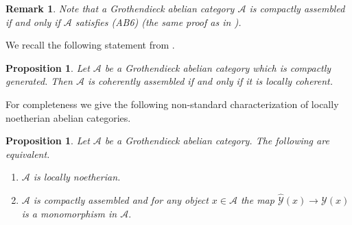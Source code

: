 \documentclass[11pt,leqno]{amsart}
\newtheorem{prop}[theo]{Proposition}
\newtheorem{remark}[theo]{Remark}
\numberwithin{equation}{section}
\newcommand{\cA}{{\mathcal A}}
\newcommand{\cY}{{\mathcal Y}}
\begin{document}
\begin{remark}
Note that a Grothendieck abelian category $\cA$ is compactly assembled if and only if $\cA$ satisfies (AB6) (the same proof as in \cite[Proposition 1.53]{E24}).
\end{remark}

We recall the following statement from \cite{E24}.

\begin{prop}\label{prop:coh_ass_comp_gen}\cite[Proposition E.8]{E24}
	Let $\cA$ be a Grothendieck abelian category which is compactly generated. Then $\cA$ is coherently assembled if and only if it is locally coherent.
\end{prop}

For completeness we give the following non-standard characterization of locally noetherian abelian categories.

\begin{prop}
Let $\cA$ be a Grothendieck abelian category. The following are equivalent.
\begin{enumerate}[label=(\roman*),ref=(\roman*)]
	\item $\cA$ is locally noetherian. \label{loc_noeth}
	\item $\cA$ is compactly assembled and for any object $x\in\cA$ the map $\hat{\cY}(x)\to\cY(x)$ is a monomorphism in $\cA.$ \label{mono_from_hat_Y_to_Y}
\end{enumerate}
\end{prop}
\end{document}
